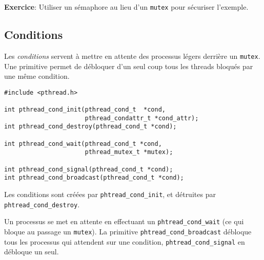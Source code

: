 \textbf{Exercice}: Utiliser un sémaphore au lieu d'un \texttt{mutex} 
pour sécuriser l'exemple.

\subsection{Conditions}

Les \emph{conditions}  servent à mettre en attente 
des processus légers derrière un \texttt{mutex}. 
Une primitive permet de débloquer d'un seul
coup tous les threads bloqués par une même condition.


\extrait
\begin{lstlisting}
#include <pthread.h>

int pthread_cond_init(pthread_cond_t  *cond, 
                      pthread_condattr_t *cond_attr);
int pthread_cond_destroy(pthread_cond_t *cond);

int pthread_cond_wait(pthread_cond_t *cond,
                      pthread_mutex_t *mutex);

int pthread_cond_signal(pthread_cond_t *cond);
int pthread_cond_broadcast(pthread_cond_t *cond);
\end{lstlisting}




Les conditions sont créées par
\texttt{phtread\_cond\_init}, et  détruites par \texttt{phtread\_cond\_destroy}.

 
Un processus se met en attente en effectuant un 
\texttt{phtread\_cond\_wait} (ce qui bloque au passage un \texttt{mutex}).
La primitive 
\texttt{phtread\_cond\_broadcast} débloque tous les processus qui attendent
sur une condition, \texttt{phtread\_cond\_signal} en débloque un seul.



